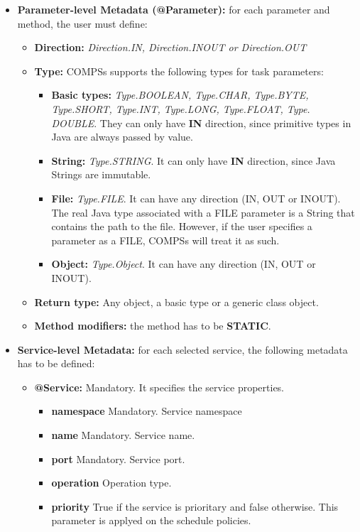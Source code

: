 \begin{itemize}
 \item {\bf Parameter-level Metadata (@Parameter):} for each parameter and method, the user must define:
       \begin{itemize}
        \item {\bf Direction:} {\it Direction.IN, Direction.INOUT or Direction.OUT}
        \item {\bf Type:} COMPSs supports the following types for task parameters:
              \begin{itemize}
               \item {\bf Basic types:} {\it Type.BOOLEAN, Type.CHAR, Type.BYTE, Type.SHORT, Type.INT, Type.LONG,
                     Type.FLOAT, Type. DOUBLE}. They can only have {\bf IN} direction, since primitive types in Java are
                     always passed by value.
               \item {\bf String:} {\it Type.STRING}. It can only have {\bf IN} direction, since Java Strings are immutable.
               \item {\bf File:} {\it Type.FILE}. It can have any direction (IN, OUT or INOUT). The real Java type associated
                     with a FILE parameter is a String that contains the path to the file. However, if the user specifies
                     a parameter as a FILE, COMPSs will treat it as such.
               \item {\bf Object:} {\it Type.Object}. It can have any direction (IN, OUT or INOUT).
              \end{itemize}
        \item {\bf Return type:} Any object, a basic type or a generic class object.
        \item {\bf Method modifiers:} the method has to be {\bf STATIC}.
       \end{itemize}

 \item \textbf{Service-level Metadata:} for each selected service, the following metadata has to be defined:
       \begin{itemize}
         \item \textbf{@Service:} Mandatory. It specifies the service properties. 
		\begin{itemize}
			\item \textbf{namespace} Mandatory. Service namespace
			\item \textbf{name} Mandatory. Service name.
			\item \textbf{port} Mandatory. Service port.
			\item \textbf{operation} Operation type. 
			\item \textbf{priority} True if the service is prioritary and false otherwise. This parameter is applyed 
			on the schedule policies. 
		\end{itemize}
\end{itemize}


\end{itemize}
